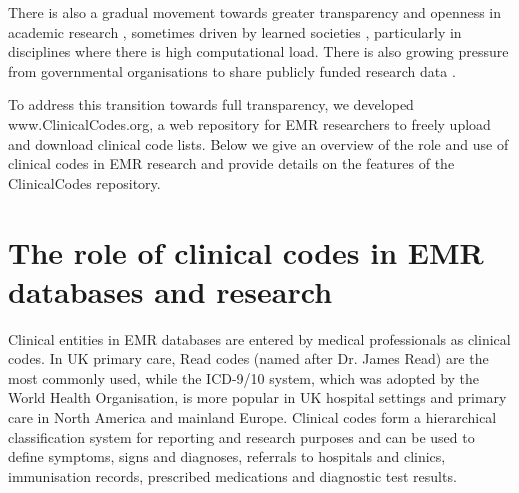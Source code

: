 \documentclass[10pt]{article}
\begin{document}
There is also a gradual movement towards greater transparency and openness in academic research \cite{Bechhofer2013, Stodden2013, Pampel2013}, sometimes driven by learned societies \cite{RoyalSoc2012}, particularly in disciplines where there is high computational load. There is also growing pressure from governmental organisations to share publicly funded research data \cite{EuropeanCommission2012, OfficeSciTech2013}.

To address this transition towards full transparency, we developed www.ClinicalCodes.org, a web repository for EMR researchers to freely upload and download clinical code lists.  Below we give an overview of the role and use of clinical codes in EMR research and provide details on the features of the ClinicalCodes repository.


\section*{The role of clinical codes in EMR databases and research}


Clinical entities in EMR databases are entered by medical professionals as clinical codes.  In UK primary care, Read codes (named after Dr. James Read) are the most commonly used, while the ICD-9/10 system, which was adopted by the World Health Organisation,  is more popular in UK hospital settings and primary care in North America and mainland Europe.  Clinical codes form a hierarchical classification system for reporting and research purposes and can be used to define symptoms, signs and diagnoses, referrals to hospitals and clinics, immunisation records, prescribed medications and diagnostic test results.
\end{document}
